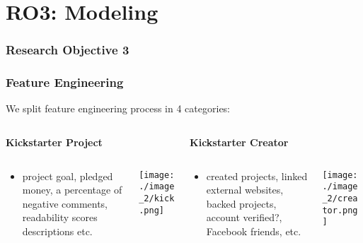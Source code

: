 \documentclass[9pt]{beamer}
\begin{document}
\section{RO3: Modeling}
\begin{frame}
\frametitle{Research Objective 3}
\centering
\textcolor{black}{\LARGE {}}
\end{frame}






\begin{frame}
\frametitle{Feature Engineering}
We split feature engineering process in 4 categories:
\begin{columns}[T] 
	\begin{column}{.48\textwidth} {\textbf{Kickstarter Project}}
		\begin{columns}
			\begin{column}{.80\textwidth} 
									
				\begin{itemize}[label=\textcolor{blue}{\textbullet}]
					\item{\small project goal, 
						pledged money, 
						a percentage of negative comments, 
						readability scores descriptions etc.}
				\end{itemize}
			\end{column}		
			
			\begin{column}{.20\textwidth} 
				\texttt{[image: ./image\_2/kick.png]}
			\end{column}				
		\end{columns}
	\end{column}
	
	
	\begin{column}{.48\textwidth} {\textbf{Kickstarter Creator}}
		\begin{columns}
			\begin{column}{.70\textwidth} 
				\begin{itemize}[label=\textcolor{blue}{\textbullet}]
					\item{\small \text{\textbar}created projects\text{\textbar}, \text{\textbar}linked external websites\text{\textbar}, \text{\textbar}backed projects\text{\textbar}, account verified?, \text{\textbar}Facebook friends\text{\textbar}, etc. }
				\end{itemize}
			\end{column}		
			
			\begin{column}{.30\textwidth} 
				\texttt{[image: ./image\_2/creator.png]}
			\end{column}				
		\end{columns}
	\end{column}
\end{columns}


\end{frame}
\end{document}
